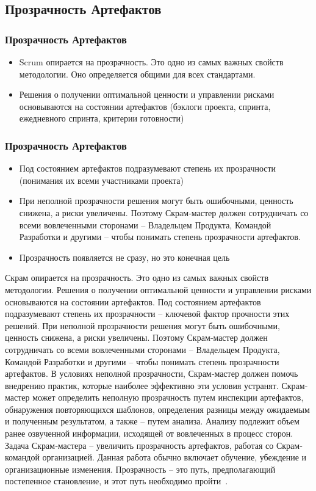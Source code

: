 \documentclass{../industrial-development}
\begin{document}
\subsection{Прозрачность Артефактов}
\begin{frame}\frametitle {Прозрачность Артефактов}

\begin{itemize}
\item Scrum опирается на прозрачность. Это одно из самых важных свойств методологии. Оно определяется \alert{общими для всех} стандартами. 
\item Решения о получении оптимальной ценности и управлении рисками основываются на состоянии артефактов (бэклоги проекта, спринта, ежедневного спринта, критерии готовности)
\end{itemize}
\end {frame}

\begin{frame}\frametitle {Прозрачность Артефактов}

\begin{itemize}
\item Под состоянием артефактов подразумевают степень их прозрачности (понимания их всеми участниками проекта)
\item При неполной прозрачности решения могут быть ошибочными, ценность снижена, а риски увеличены. Поэтому Скрам‐мастер должен сотрудничать со всеми вовлеченными сторонами – Владельцем Продукта, Командой Разработки и другими – чтобы понимать степень прозрачности артефактов.
\item Прозрачность появляется не сразу, но это \alert{конечная цель}
\end{itemize}
\end {frame}
\lecturenotes
Скрам опирается на прозрачность. Это одно из самых важных свойств методологии. Решения о получении оптимальной ценности и управлении рисками основываются на состоянии артефактов. Под состоянием артефактов подразумевают степень их
прозрачности – ключевой фактор прочности этих решений. При неполной прозрачности решения могут быть ошибочными, ценность снижена, а риски увеличены. Поэтому Скрам‐мастер должен сотрудничать со всеми вовлеченными
сторонами – Владельцем Продукта, Командой Разработки и другими – чтобы понимать
степень прозрачности артефактов. В условиях неполной прозрачности, Скрам‐мастер должен помочь внедрению практик,
которые наиболее эффективно эти условия устранят. Скрам‐мастер может определить неполную прозрачность путем инспекции артефактов, обнаружения повторяющихся шаблонов, определения разницы между ожидаемым и полученным результатом, а также – путем анализа. Анализу подлежит объем ранее озвученной информации, исходящей от вовлеченных в процесс сторон.
Задача Скрам‐мастера – увеличить прозрачность артефактов, работая со Скрам‐командой организацией. Данная работа обычно включает обучение, убеждение и организационные изменения. Прозрачность – это путь, предполагающий постепенное
становление, и этот путь необходимо пройти~\cite{Scrum}.
\end{document}
